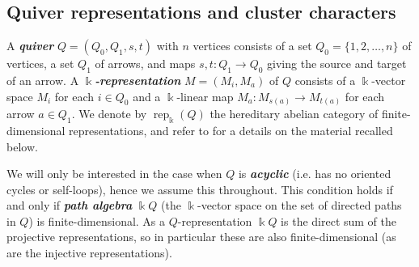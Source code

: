 \documentclass[12pt]{amsart}
\newcommand{\newword}[1]{\textbf{\emph{#1}}}
\newcommand{\kk}{\Bbbk}
\newcommand{\rep}{\operatorname{rep}}
\DeclareMathOperator{\Hom}{Hom}
\theoremstyle{remark}
\numberwithin{equation}{section}
\numberwithin{figure}{section}
\begin{document}
\subsection{Quiver representations and cluster characters}\label{sec:quiverbackground}
A \newword{quiver} $Q=(Q_0,Q_1,s,t)$ with $n$ vertices consists of a set $Q_0=\{1,2,\ldots,n\}$ of vertices, a set $Q_1$ of arrows, and maps $s,t:Q_1\to Q_0$ giving the source and target of an arrow.
A \newword{$\kk$-representation} $M=(M_i,M_a)$ of $Q$ consists of a $\kk$-vector space $M_i$ for each $i\in Q_0$ and a $\kk$-linear map $M_a:M_{s(a)}\to M_{t(a)}$ for each arrow $a\in Q_1$. We denote by $\rep_\kk(Q)$ the hereditary abelian category of finite-dimensional representations, and refer to \cite{ASS06} for a details on the material recalled below. 

We will only be interested in the case when $Q$ is \newword{acyclic} (i.e. has no oriented cycles or self-loops), hence we assume this throughout. This condition holds if and only if \newword{path algebra} $\kk Q$ (the $\kk$-vector space on the set of directed paths in $Q$) is finite-dimensional. As a $Q$-representation $\kk Q$ is the direct sum of the projective representations, so in particular these are also finite-dimensional (as are the injective representations).



\end{document}

